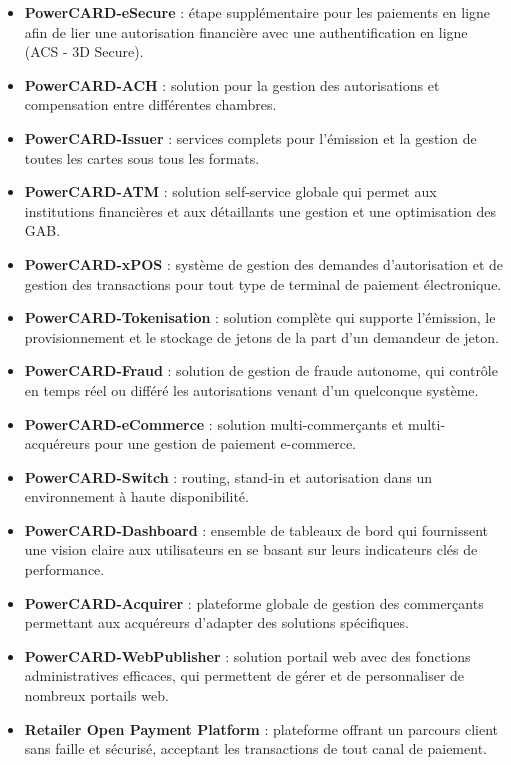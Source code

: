\begin{itemize}[leftmargin=*]
\item \textbf{PowerCARD-eSecure} : étape supplémentaire pour les paiements en ligne afin de lier une autorisation financière avec une authentification en ligne (ACS - 3D Secure).
\item \textbf{PowerCARD-ACH} : solution pour la gestion des autorisations et compensation entre différentes chambres.
\item \textbf{PowerCARD-Issuer} : services complets pour l'émission et la gestion de toutes les cartes sous tous les formats.
\item \textbf{PowerCARD-ATM} : solution self-service globale qui permet aux institutions financières et aux détaillants une gestion et une optimisation des GAB.
\item \textbf{PowerCARD-xPOS} : système de gestion des demandes d'autorisation et de gestion des transactions pour tout type de terminal de paiement électronique.
\item \textbf{PowerCARD-Tokenisation} : solution complète qui supporte l'émission, le provisionnement et le stockage de jetons de la part d'un demandeur de jeton.
\item \textbf{PowerCARD-Fraud} : solution de gestion de fraude autonome, qui contrôle en temps réel ou différé les autorisations venant d'un quelconque système.
\item \textbf{PowerCARD-eCommerce} : solution multi-commerçants et multi-acquéreurs pour une gestion de paiement e-commerce.
\item \textbf{PowerCARD-Switch} : routing, stand-in et autorisation dans un environnement à haute disponibilité.
\item \textbf{PowerCARD-Dashboard} : ensemble de tableaux de bord qui fournissent une vision claire aux utilisateurs en se basant sur leurs indicateurs clés de performance.
\item \textbf{PowerCARD-Acquirer} : plateforme globale de gestion des commerçants permettant aux acquéreurs d'adapter des solutions spécifiques.
\item \textbf{PowerCARD-WebPublisher} : solution portail web avec des fonctions administratives efficaces, qui permettent de gérer et de personnaliser de nombreux portails web.
\item \textbf{Retailer Open Payment Platform} : plateforme offrant un parcours client sans faille et sécurisé, acceptant les transactions de tout canal de paiement.
\end{itemize}

